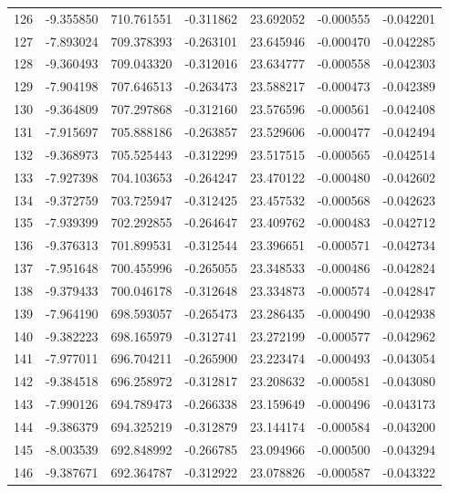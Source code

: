\begin{tabular}{rrrrrrr}
 126 &  -9.355850 &  710.761551 & -0.311862 &  23.692052 &  -0.000555 & -0.042201 \\
 127 &  -7.893024 &  709.378393 & -0.263101 &  23.645946 &  -0.000470 & -0.042285 \\
 128 &  -9.360493 &  709.043320 & -0.312016 &  23.634777 &  -0.000558 & -0.042303 \\
 129 &  -7.904198 &  707.646513 & -0.263473 &  23.588217 &  -0.000473 & -0.042389 \\
 130 &  -9.364809 &  707.297868 & -0.312160 &  23.576596 &  -0.000561 & -0.042408 \\
 131 &  -7.915697 &  705.888186 & -0.263857 &  23.529606 &  -0.000477 & -0.042494 \\
 132 &  -9.368973 &  705.525443 & -0.312299 &  23.517515 &  -0.000565 & -0.042514 \\
 133 &  -7.927398 &  704.103653 & -0.264247 &  23.470122 &  -0.000480 & -0.042602 \\
 134 &  -9.372759 &  703.725947 & -0.312425 &  23.457532 &  -0.000568 & -0.042623 \\
 135 &  -7.939399 &  702.292855 & -0.264647 &  23.409762 &  -0.000483 & -0.042712 \\
 136 &  -9.376313 &  701.899531 & -0.312544 &  23.396651 &  -0.000571 & -0.042734 \\
 137 &  -7.951648 &  700.455996 & -0.265055 &  23.348533 &  -0.000486 & -0.042824 \\
 138 &  -9.379433 &  700.046178 & -0.312648 &  23.334873 &  -0.000574 & -0.042847 \\
 139 &  -7.964190 &  698.593057 & -0.265473 &  23.286435 &  -0.000490 & -0.042938 \\
 140 &  -9.382223 &  698.165979 & -0.312741 &  23.272199 &  -0.000577 & -0.042962 \\
 141 &  -7.977011 &  696.704211 & -0.265900 &  23.223474 &  -0.000493 & -0.043054 \\
 142 &  -9.384518 &  696.258972 & -0.312817 &  23.208632 &  -0.000581 & -0.043080 \\
 143 &  -7.990126 &  694.789473 & -0.266338 &  23.159649 &  -0.000496 & -0.043173 \\
 144 &  -9.386379 &  694.325219 & -0.312879 &  23.144174 &  -0.000584 & -0.043200 \\
 145 &  -8.003539 &  692.848992 & -0.266785 &  23.094966 &  -0.000500 & -0.043294 \\
 146 &  -9.387671 &  692.364787 & -0.312922 &  23.078826 &  -0.000587 & -0.043322 \\

\end{tabular}
